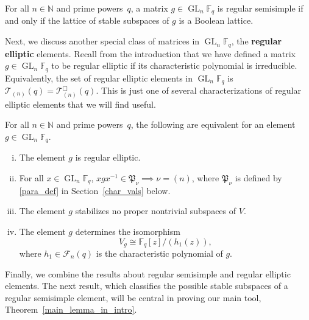 \documentclass[Unicode,ALCO]{cedram}
\DeclareMathOperator{\GL}{GL}
\newcommand{\F}{\mathbb{F}}
\newcommand{\CF}{\mathcal{F}}
\newcommand{\N}{\mathbb{N}}
\newcommand{\CT}{\mathcal{T}}
\newcommand{\myemph}{\textbf}
\newcommand{\para}{\mathfrak{P}}
\begin{document}
\begin{theorem} \label{helpful}
For all \(n \in \N\) and prime powers~\(q\), a matrix \(g \in \GL_n \F_q\) is regular semisimple if and only if the lattice of stable subspaces of \(g\) is a Boolean lattice.
\end{theorem}




Next, we discuss another special class of matrices in $\GL_n \F_q$, the \myemph{regular elliptic} elements.
Recall from the introduction that we have defined a matrix \(g \in \GL_n \F_q\) to be regular elliptic if its characteristic polynomial is irreducible.
Equivalently, the set of regular elliptic elements in \(\GL_n \F_q\) is \(\CT_{(n)} (q) = \CT_{(n)}^\Box (q)\).
This is just one of several characterizations of regular elliptic elements that we will find useful.

\begin{proposition}
\label{reg_ell_char}
For all \(n \in \N\) and prime powers~\(q\), the following are equivalent for an element $g \in \GL_n \F_q$.
\begin{enumerate}[(i)]
\item The element $g$ is regular elliptic.
\item For all $x \in \GL_n \F_q$, $xgx^{-1} \in \para_\nu \implies \nu = (n)$, where \(\para_\nu\) is defined by \eqref{para_def} in Section~\ref{char_vals} below.
\item \label{no_stability} The element \(g\) stabilizes no proper nontrivial subspaces of \(V\).
\item The element \(g\) determines the isomorphism
\begin{equation}
\label{re_rcf}
V_g
\cong
\F_q[z] / (h_1(z)),
\end{equation}
where \(h_1 \in \CF_n (q)\) is the characteristic polynomial of \(g\).
\end{enumerate}
\end{proposition}


Finally, we combine the results about regular semisimple and regular elliptic elements.
The next result, which classifies the possible stable subspaces of a regular semisimple element, will be central in proving our main tool, Theorem~\ref{main_lemma_in_intro}.
\end{document}
